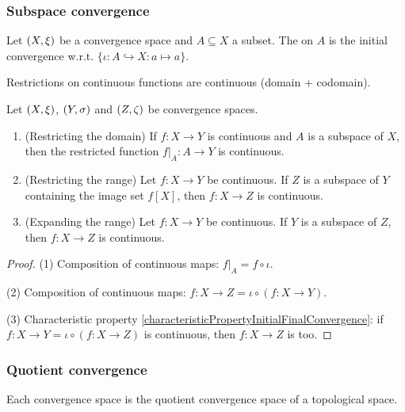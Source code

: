 \subsubsection{Subspace convergence}
\begin{definition}
Let $\left( X,\xi \right)$ be a convergence space and $A\subseteq X$ a subset. The  on $A$ is the initial convergence w.r.t. $\{\iota: A \hookrightarrow X: a\mapsto a\}$.
\end{definition}

\begin{lemma}
Restrictions on continuous functions are continuous (domain + codomain).
\end{lemma}

\begin{proposition} \label{continuityRestrictionExpansion}
Let $\left( X,\xi \right)$, $\left( Y,\sigma \right)$ and $\left( Z,\zeta \right)$ be convergence spaces.
\begin{enumerate}
\item \textup{(Restricting the domain)} If $f:X\to Y$ is continuous and $A$ is a subspace of $X$, then the restricted function $f|_{A}:A\to Y$ is continuous.
\item \textup{(Restricting the range)} Let $f:X\to Y$ be continuous. If $Z$ is a subspace of $Y$ containing the image set $f[X]$, then $f:X\to Z$ is continuous.
\item \textup{(Expanding the range)} Let $f:X\to Y$ be continuous. If $Y$ is a subspace of $Z$, then $f:X\to Z$ is continuous.
\end{enumerate}
\end{proposition}
\begin{proof}
(1) Composition of continuous maps: $f|_{A} = f\circ\iota$.

(2) Composition of continuous maps: $f:X\to Z = \iota \circ (f: X\to Y)$.

(3) Characteristic property \ref{characteristicPropertyInitialFinalConvergence}: if $f:X\to Y = \iota \circ (f:X\to Z)$ is continuous, then $f:X\to Z$ is too.
\end{proof}



\subsubsection{Quotient convergence}
\begin{proposition}
Each convergence space is the quotient convergence space of a topological space.
\end{proposition}

